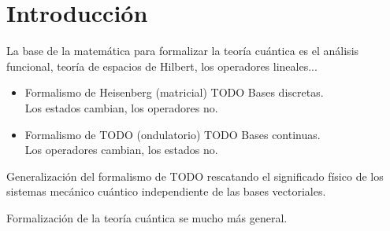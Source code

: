\section{Introducción}

La base de la matemática para formalizar la teoría cuántica es el análisis funcional, teoría de espacios de Hilbert, los operadores lineales...

\begin{itemize}
    \item Formalismo de Heisenberg (matricial) TODO Bases discretas.\\
    Los estados cambian, los operadores no.
    \item Formalismo de TODO (ondulatorio) TODO Bases continuas.\\
    Los operadores cambian, los estados no.
\end{itemize}

Generalización del formalismo de TODO rescatando el significado físico de los sistemas mecánico cuántico independiente de las bases vectoriales.

Formalización de la teoría cuántica se mucho más general.

